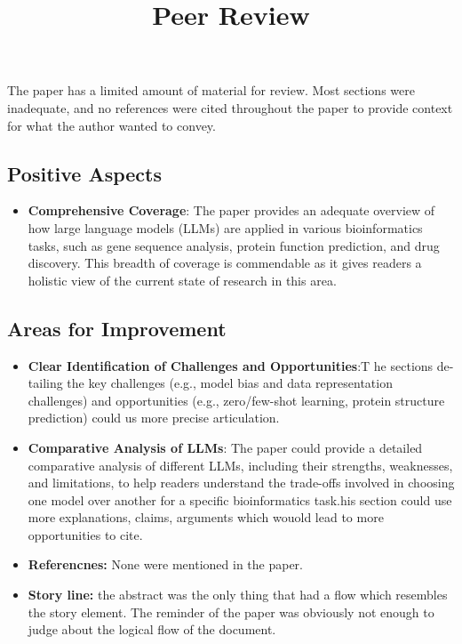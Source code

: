 \documentclass[12pt]{article}
\title{Peer Review}
\author{}
\date{}
\begin{document}
\maketitle

\paragraph{}The paper has a limited amount of material for review. Most sections were inadequate, and no references were cited throughout the paper to provide context for what the author wanted to convey. 

\subsection*{Positive Aspects}
\begin{itemize}
    \item \textbf{Comprehensive Coverage}: The paper provides an adequate overview of how large language models (LLMs) are applied in various bioinformatics tasks, such as gene sequence analysis, protein function prediction, and drug discovery. This breadth of coverage is commendable as it gives readers a holistic view of the current state of research in this area.
\end{itemize}

\subsection*{Areas for Improvement}
\begin{itemize}
    \item \textbf{Clear Identification of Challenges and Opportunities}:T he sections de-
    tailing the key challenges (e.g., model bias and data representation challenges)
    and opportunities (e.g., zero/few-shot learning, protein structure prediction) could us more precise articulation. 
    \item \textbf{Comparative Analysis of LLMs}: The paper could provide a detailed comparative analysis of different LLMs, including their strengths, weaknesses, and limitations, to help readers understand the trade-offs involved in choosing one model over another for a specific bioinformatics task.his section could use more explanations, claims, arguments which wouold lead to more opportunities to cite.
    \item  \textbf{Referencnes: }None were mentioned in the paper.
    \item \textbf{Story line:} the abstract was the only thing that had a flow which resembles the story element. The reminder of the paper was obviously not enough to judge about the logical flow of the document.
\end{itemize}
\end{document}
